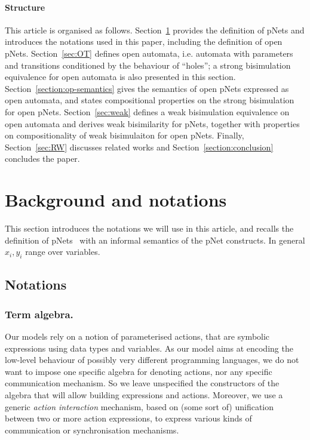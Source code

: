 \documentclass{lmcs}
\begin{document}
\paragraph{Structure}
This article is organised as follows. Section~\ref{sec:notations}
provides the definition of pNets and introduces the notations used in
this paper, including the definition of open pNets. 
Section~\ref{sec:OT} defines open automata, i.e. automata
with parameters and transitions conditioned by the behaviour of
``holes''; a strong bisimulation equivalence for open automata is also
presented in this section. 
Section~\ref{section:op-semantics} gives
the semantics of open pNets expressed as open automata, and states
compositional properties on the strong bisimulation for open
pNets. 
Section~\ref{sec:weak} defines a weak bisimulation
equivalence on open automata and derives weak bisimilarity for pNets,
together with properties on compositionality of weak bisimulaiton for
open pNets. 
Finally, Section~\ref{sec:RW} discusses related works and Section~\ref{section:conclusion} concludes the
paper. 


\section{Background and notations}\label{sec:notations}
This section introduces the notations we will use in this article, and  recalls the definition of pNets~\cite{henrio:Forte2016} with an informal semantics  of the pNet constructs.
In general $x_i,y_i$ range over variables.

\subsection{Notations}
\subsubsection*{Term algebra.}
Our models rely on a notion of parameterised actions, that are
symbolic expressions using data types and variables. As our model aims
at encoding the low-level behaviour of possibly very different
programming languages, we do not want to impose one specific algebra
for denoting actions, nor any specific communication mechanism. So we
leave unspecified the constructors of the algebra that will allow building
expressions and actions. Moreover, we use a generic {\em action interaction}
mechanism, based on (some sort of) unification between two or more action
expressions, to express various kinds of communication or
synchronisation mechanisms.
\end{document}
